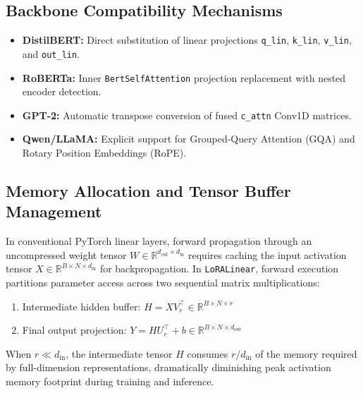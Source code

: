 {\subsection{Backbone Compatibility Mechanisms}
\begin{itemize}
\item \textbf{DistilBERT:} Direct substitution of linear projections \texttt{q\_lin}, \texttt{k\_lin}, \texttt{v\_lin}, and \texttt{out\_lin}.
\item \textbf{RoBERTa:} Inner \texttt{BertSelfAttention} projection replacement with nested encoder detection.
\item \textbf{GPT-2:} Automatic transpose conversion of fused \texttt{c\_attn} Conv1D matrices.
\item \textbf{Qwen/LLaMA:} Explicit support for Grouped-Query Attention (GQA) and Rotary Position Embeddings (RoPE).
\end{itemize}

\subsection{Memory Allocation and Tensor Buffer Management}
In conventional PyTorch linear layers, forward propagation through an uncompressed weight tensor $W \in \mathbb{R}^{d_{\text{out}} \times d_{\text{in}}}$ requires caching the input activation tensor $X \in \mathbb{R}^{B \times N \times d_{\text{in}}}$ for backpropagation. In \texttt{LoRALinear}, forward execution partitions parameter access across two sequential matrix multiplications:
\begin{enumerate}
\item Intermediate hidden buffer: $H = X V_r^\top \in \mathbb{R}^{B \times N \times r}$
\item Final output projection: $Y = H U_r^\top + b \in \mathbb{R}^{B \times N \times d_{\text{out}}}$
\end{enumerate}
When $r \ll d_{\text{in}}$, the intermediate tensor $H$ consumes $r / d_{\text{in}}$ of the memory required by full-dimension representations, dramatically diminishing peak activation memory footprint during training and inference.

}
